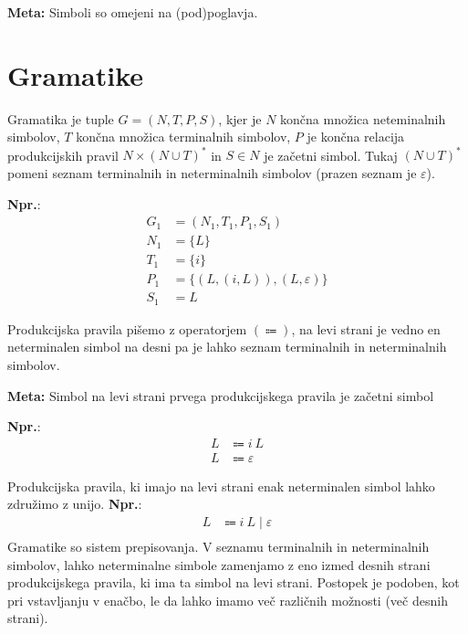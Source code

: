 \documentclass{article}
\newcommand{\Ex}{\textbf{Npr.}:\ }
\newcommand{\Special}[1]{\textbf{#1}}
\newcommand{\Grammar}{G}
\newcommand{\Terminals}{T}
\newcommand{\NonTerminals}{N}
\newcommand{\Productions}{P}
\newcommand{\StartSymbol}{S}
\newcommand{\Null}{\varepsilon}
\newcommand{\Arrow}{\Coloneqq}
\newcommand{\Seq}{\ }
\newcommand{\Union}{\mathrel{|}}
\newcommand{\Kleene}[1]{#1^\ast}
\begin{document}
\Special{Meta:} Simboli so omejeni na (pod)poglavja.

\section{Gramatike}
Gramatika je tuple $\Grammar = (\NonTerminals, \Terminals, \Productions, \StartSymbol)$, kjer je $\NonTerminals$ končna množica neteminalnih simbolov, $\Terminals$ končna množica terminalnih simbolov, $\Productions$ je končna relacija produkcijskih pravil $\NonTerminals \times \Kleene{(\NonTerminals \cup \Terminals)}$ in $\StartSymbol \in \NonTerminals$ je začetni simbol.
Tukaj $\Kleene{(\NonTerminals \cup \Terminals)}$ pomeni seznam terminalnih in neterminalnih simbolov (prazen seznam je $\Null$).

\Ex
\begin{align*}
  \Grammar_1 &= (\NonTerminals_1, \Terminals_1, \Productions_1, \StartSymbol_1) \\
  \NonTerminals_1 &= \{L\}\\
  \Terminals_1 &= \{i\}\\
  \Productions_1 &= \{ (L, (i, L)), (L, \Null) \}\\
  \StartSymbol_1 &= L
\end{align*}

Produkcijska pravila pišemo z operatorjem $(\Arrow)$, na levi strani je vedno en neterminalen simbol na desni pa je lahko seznam terminalnih in neterminalnih simbolov.

\Special{Meta:} Simbol na levi strani prvega produkcijskega pravila je začetni simbol

\Ex
\begin{equation}
  \tag{$\Grammar_1$}
  \label{g:listi}
  \begin{aligned}
    L &\Arrow i \Seq L\\
    L &\Arrow \Null
  \end{aligned}
\end{equation}

Produkcijska pravila, ki imajo na levi strani enak neterminalen simbol lahko združimo z unijo.
\Ex
\begin{align*}
  L &\Arrow i \Seq L \Union \Null\\
\end{align*}
Gramatike so sistem prepisovanja.
V seznamu terminalnih in neterminalnih simbolov, lahko neterminalne simbole zamenjamo z eno izmed desnih strani produkcijskega pravila, ki ima ta simbol na levi strani.
Postopek je podoben, kot pri vstavljanju v enačbo, le da lahko imamo več različnih možnosti (več desnih strani).
\end{document}
